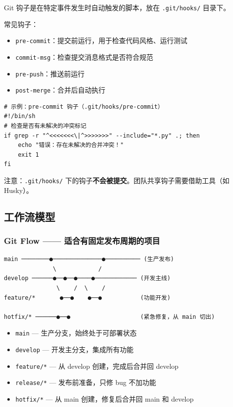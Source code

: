 \documentclass[12pt,a4paper]{article}
\begin{document}
Git 钩子是在特定事件发生时自动触发的脚本，放在 \texttt{.git/hooks/} 目录下。

常见钩子：
\begin{itemize}[itemsep=3pt]
    \item \texttt{pre-commit}：提交前运行，用于检查代码风格、运行测试
    \item \texttt{commit-msg}：检查提交消息格式是否符合规范
    \item \texttt{pre-push}：推送前运行
    \item \texttt{post-merge}：合并后自动执行
\end{itemize}

\begin{lstlisting}
# 示例：pre-commit 钩子（.git/hooks/pre-commit）
#!/bin/sh
# 检查是否有未解决的冲突标记
if grep -r "^<<<<<<<\|^>>>>>>>" --include="*.py" .; then
    echo "错误：存在未解决的合并冲突！"
    exit 1
fi
\end{lstlisting}

注意：\texttt{.git/hooks/} 下的钩子\textbf{不会被提交}。团队共享钩子需要借助工具（如 Husky）。

\subsection{工作流模型}

\subsubsection{Git Flow —— 适合有固定发布周期的项目}

\begin{lstlisting}[numbers=none]
main ────────●──────────────●────────── (生产发布)
              \            /
develop ──────●──●──●────●──────────── (开发主线)
               \    /  \    /
feature/*       ●──●    ●──●           (功能开发)

hotfix/* ──────●──●                    (紧急修复，从 main 切出)
\end{lstlisting}

\begin{itemize}[itemsep=3pt]
    \item \texttt{main} — 生产分支，始终处于可部署状态
    \item \texttt{develop} — 开发主分支，集成所有功能
    \item \texttt{feature/*} — 从 develop 创建，完成后合并回 develop
    \item \texttt{release/*} — 发布前准备，只修 bug 不加功能
    \item \texttt{hotfix/*} — 从 main 创建，修复后合并回 main 和 develop
\end{itemize}
\end{document}
